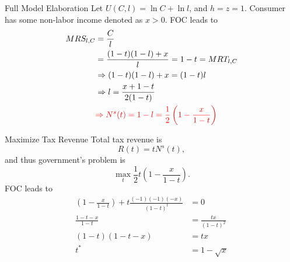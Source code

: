 \documentclass[11pt,aspectratio=43]{beamer}
\newcommand{\red}[1]{\textcolor{red}{#1}}
\theoremstyle{definition}
\begin{document}
\begin{frame}{Full Model Elaboration}
\label{slide:Full_Model_Elaboration}
    Let $ U( C, l ) = \ln C + \ln l $, and $ h = z = 1 $. Consumer has some non-labor income denoted as $ x > 0 $. FOC leads to
    \begin{align*}
        MRS_{l, C}
            & = \frac{C}{l}
        \\
            & = \frac{( 1-t )( 1-l ) + x}{l} = 1 - t = MRT_{l, C}
        \\
            & \Rightarrow ( 1-t )( 1-l ) + x = ( 1-t )l
        \\
            & \Rightarrow l = \frac{x + 1 - t}{2( 1-t )}
        \\
            & \red{ \Rightarrow N^{s} ( t ) = 1-l = \frac{1}{2} \left( 1 - \frac{x}{1-t} \right)}
    \end{align*}
\end{frame}

\begin{frame}{Maximize Tax Revenue}
\label{slide:Maximize_Tax_Revenue}
    Total tax revenue is
    \begin{equation*}
       R( t ) = t N^{s}( t )
    ,\end{equation*}
    and thus government's problem is
    \begin{equation*}
       \max_{t} \frac{1}{2} t \left(
        1 - \frac{x}{1-t}
       \right)
    .\end{equation*}
    FOC leads to
    \begin{align*}
        ( 1 - \frac{x}{1-t} ) + t \frac{(-1)( -1 )( -x )}{( 1-t )^{t}}
            & = 0
        \\
        \frac{1-t-x}{1-t}
            & = \frac{tx}{(1-t)^{2}}
        \\
        ( 1-t )( 1-t-x )
            &= tx
        \\
        t^{*}
            &= 1 - \sqrt{x}
    \end{align*}
\end{frame}
\end{document}
